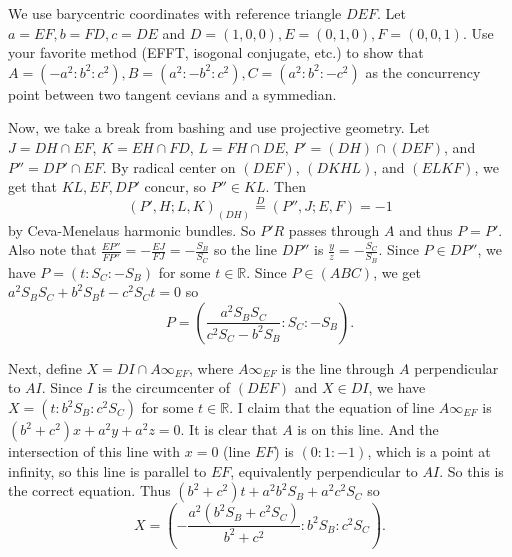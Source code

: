 We use barycentric coordinates with reference triangle $DEF$. Let $a=EF,b=FD,c=DE$ and $D=(1,0,0),E=(0,1,0),F=(0,0,1)$. Use your favorite method (EFFT, isogonal conjugate, etc.) to show that $A=(-a^2:b^2:c^2),B=(a^2:-b^2:c^2),C=(a^2:b^2:-c^2)$ as the concurrency point between two tangent cevians and a symmedian.

Now, we take a break from bashing and use projective geometry. Let $J=DH\cap EF$, $K=EH\cap FD$, $L=FH\cap DE$, $P'=(DH)\cap(DEF)$, and $P''=DP'\cap EF$. By radical center on $(DEF)$, $(DKHL)$, and $(ELKF)$, we get that $KL,EF,DP'$ concur, so $P''\in KL$. Then \[(P',H;L,K)_{(DH)}\stackrel{D}{=}(P'',J;E,F)=-1\] by Ceva-Menelaus harmonic bundles. So $P'R$ passes through $A$ and thus $P=P'$. Also note that $\frac{EP''}{FP''}=-\frac{EJ}{FJ}=-\frac{S_B}{S_C}$ so the line $DP''$ is $\frac{y}{z}=-\frac{S_C}{S_B}$. Since $P\in DP''$, we have $P=(t:S_C:-S_B)$ for some $t\in\mathbb{R}$. Since $P\in(ABC)$, we get $a^2S_BS_C+b^2S_Bt-c^2S_Ct=0$ so \[P=\left(\frac{a^2S_BS_C}{c^2S_C-b^2S_B}:S_C:-S_B\right).\]

Next, define $X=DI\cap A\infty_{EF}$, where $A\infty_{EF}$ is the line through $A$ perpendicular to $AI$. Since $I$ is the circumcenter of $(DEF)$ and $X\in DI$, we have $X=(t:b^2S_B:c^2S_C)$ for some $t\in\mathbb{R}$. I claim that the equation of line $A\infty_{EF}$ is $(b^2+c^2)x+a^2y+a^2z=0$. It is clear that $A$ is on this line. And the intersection of this line with $x=0$ (line $EF$) is $(0:1:-1)$, which is a point at infinity, so this line is parallel to $EF$, equivalently perpendicular to $AI$. So this is the correct equation. Thus $(b^2+c^2)t+a^2b^2S_B+a^2c^2S_C$ so \[X=\left(-\frac{a^2(b^2S_B+c^2S_C)}{b^2+c^2}:b^2S_B:c^2S_C\right).\]


